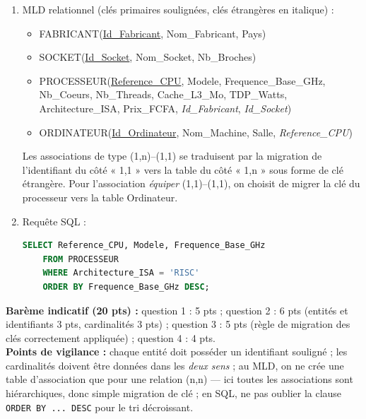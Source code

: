 \documentclass[11pt]{article}
\begin{document}
\begin{corrige}
\begin{enumerate}
\begin{itemize}
    \end{itemize}
    Associations et cardinalités :
    \begin{itemize}
        \item FABRICANT (1,n) — \emph{produire} — (1,1) PROCESSEUR : un fabricant produit plusieurs processeurs, un modèle de processeur a un seul fabricant ;
        \item SOCKET (1,n) — \emph{être compatible} — (1,1) PROCESSEUR : un socket accepte plusieurs processeurs, un processeur correspond à un seul socket ;
        \item ORDINATEUR (1,1) — \emph{équiper} — (1,1) PROCESSEUR : un ordinateur possède un processeur, un processeur est monté dans un seul ordinateur.
    \end{itemize}
    \item MLD relationnel (clés primaires soulignées, clés étrangères en italique) :
    \begin{itemize}
        \item FABRICANT(\underline{Id\_Fabricant}, Nom\_Fabricant, Pays)
        \item SOCKET(\underline{Id\_Socket}, Nom\_Socket, Nb\_Broches)
        \item PROCESSEUR(\underline{Reference\_CPU}, Modele, Frequence\_Base\_GHz, Nb\_Coeurs, Nb\_Threads, Cache\_L3\_Mo, TDP\_Watts, Architecture\_ISA, Prix\_FCFA, \emph{Id\_Fabricant}, \emph{Id\_Socket})
        \item ORDINATEUR(\underline{Id\_Ordinateur}, Nom\_Machine, Salle, \emph{Reference\_CPU})
    \end{itemize}
    Les associations de type (1,n)–(1,1) se traduisent par la migration de l'identifiant du côté « 1,1 » vers la table du côté « 1,n » sous forme de clé étrangère. Pour l'association \emph{équiper} (1,1)–(1,1), on choisit de migrer la clé du processeur vers la table Ordinateur.
    \item Requête SQL :
    \begin{lstlisting}[language=SQL]
    SELECT Reference_CPU, Modele, Frequence_Base_GHz
    FROM PROCESSEUR
    WHERE Architecture_ISA = 'RISC'
    ORDER BY Frequence_Base_GHz DESC;
    \end{lstlisting}
\end{enumerate}
\textbf{Barème indicatif (20 pts) :} question 1 : 5 pts ; question 2 : 6 pts (entités et identifiants 3 pts, cardinalités 3 pts) ; question 3 : 5 pts (règle de migration des clés correctement appliquée) ; question 4 : 4 pts.\\
\textbf{Points de vigilance :} chaque entité doit posséder un identifiant souligné ; les cardinalités doivent être données dans les \emph{deux sens} ; au MLD, on ne crée une table d'association que pour une relation (n,n) — ici toutes les associations sont hiérarchiques, donc simple migration de clé ; en SQL, ne pas oublier la clause \texttt{ORDER BY ... DESC} pour le tri décroissant.
\end{corrige}
\end{document}
